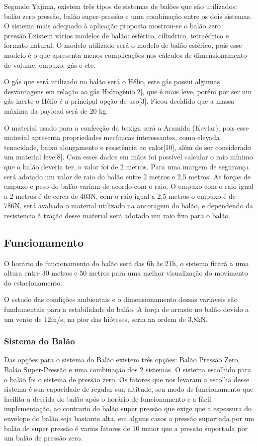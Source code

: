     Segundo Yajima, existem três tipos de sistemas de balões que são utilizados: balão zero pressão, balão super-pressão e uma combinação entre os dois sistemas. O sistema mais adequado à aplicação proposta mostrou-se o balão zero pressão.Existem vários modelos de balão: esférico, cilíndrico, tetraédrico e formato natural. O modelo utilizado será o modelo de balão esférico, pois esse modelo é o que apresenta menos complicações nos cálculos de dimensionamento de volume, empuxo, gás e etc.

    O gás que será utilizado no balão será o Hélio, este gás possui algumas desvantagens em relação ao gás Hidrogênio[2], que é mais leve, porém por ser um gás inerte o Hélio é a principal opção  de uso[3]. Ficou decidido que a massa  máxima  da payload será de 20 kg.

    O material usado para a confecção da bexiga será a Aramida (Kevlar), pois  esse material apresenta propriedades mecânicas interessantes, como elevada tenacidade, baixo alongamento e resistência ao calor[10],  além de ser considerado um material leve[8]. Com esses dados em mãos foi possível calcular o raio mínimo que o balão deveria ter, o valor foi de 2 metros. Para uma margem de segurança será adotado um valor de raio do balão entre 2 metros e 2,5 metros. As forças de empuxo e peso do balão variam de acordo com o raio. O empuxo com o raio igual a 2 metros é de cerca de 403N, com o raio igual a 2,5 metros o empuxo é de 786N, será avaliado o material utilizado na ancoragem do balão,  e dependendo da resistencia à tração desse material será adotado um raio fixo para o balão.

\subsection{Funcionamento}
    O horário de funcionamento do balão será das 6h às 21h, o sistema ficará a uma altura entre 30 metros e 50 metros para uma melhor visualização do movimento do estacionamento.

    O estudo das condições ambientais e o dimensionamento dessas variáveis são fundamentais para a estabilidade do balão. A força de arrasto no balão devido a um vento de 12m/s, na pior das hióteses, seria na ordem de 3,8kN.

  \subsubsection{Sistema do Balão}
    Das opções para o sistema do Balão existem três opções: Balão Pressão Zero, Balão Super-Pressão e uma combinação dos 2 sistemas.
    O sistema escolhido para o balão foi o sistema de pressão zero. Os fatores que nos levaram a escolha desse sistema é sua capacidade de regular sua altitude, seu modo de funcionamento que facilita a descida do balão após o horário de funcionamento e a fácil implementação, ao contrario do balão super pressão que exige que a espessura do envelope do balão seja bastante alta, em alguns casos a pressão suportada por um balão de super pressão é varios fatores de 10 maior que a pressão suportada por um balão de pressão zero.

